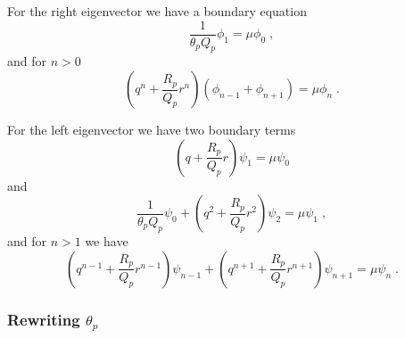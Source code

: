 \documentclass[a4paper,10pt]{article}
\begin{document}
For the right eigenvector we have a boundary equation
\begin{equation}
 \frac{1}{\theta_p Q_p} \phi_1 = \mu \phi_0 \;, 
\end{equation}
and for $n>0$
\begin{equation}
 \left( q^n + \frac{R_p}{Q_p} r^n \right) \left( \phi_{n-1} + \phi_{n+1} \right) = \mu \phi_n \;. 
\end{equation}

For the left eigenvector we have two boundary terms
\begin{equation}
 \left( q + \frac{R_p}{Q_p} r \right) \psi_1 = \mu \psi_0 
\end{equation}
and
\begin{equation}
 \frac{1}{\theta_p Q_p} \psi_0 + \left( q^2 + \frac{R_p}{Q_p} r^2 \right) \psi_2= \mu \psi_1 \;, 
\end{equation}
and for $n > 1$ we have
\begin{equation}
 \left( q^{n-1} + \frac{R_p}{Q_p} r^{n-1} \right) \psi_{n-1} + \left( q^{n+1} + \frac{R_p}{Q_p} r^{n+1} \right) \psi_{n+1} = \mu \psi_n \;. 
\end{equation}

\subsubsection{Rewriting $\theta_p$}
\end{document}
